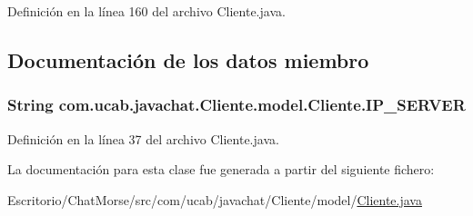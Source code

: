 Definición en la línea 160 del archivo Cliente.\-java.



\subsection{Documentación de los datos miembro}
\hypertarget{classcom_1_1ucab_1_1javachat_1_1_cliente_1_1model_1_1_cliente_a5decf95cef7084b662f4a4d207f165a5}{
\subsubsection[{I\-P\-\_\-\-S\-E\-R\-V\-E\-R}]{\setlength{\rightskip}{0pt plus 5cm}String com.\-ucab.\-javachat.\-Cliente.\-model.\-Cliente.\-I\-P\-\_\-\-S\-E\-R\-V\-E\-R\hspace{0.3cm}{\ttfamily [static]}}}\label{classcom_1_1ucab_1_1javachat_1_1_cliente_1_1model_1_1_cliente_a5decf95cef7084b662f4a4d207f165a5}


Definición en la línea 37 del archivo Cliente.\-java.



La documentación para esta clase fue generada a partir del siguiente fichero\-:\begin{DoxyCompactItemize}
\item 
Escritorio/\-Chat\-Morse/src/com/ucab/javachat/\-Cliente/model/\hyperlink{_cliente_8java}{Cliente.\-java}\end{DoxyCompactItemize}

